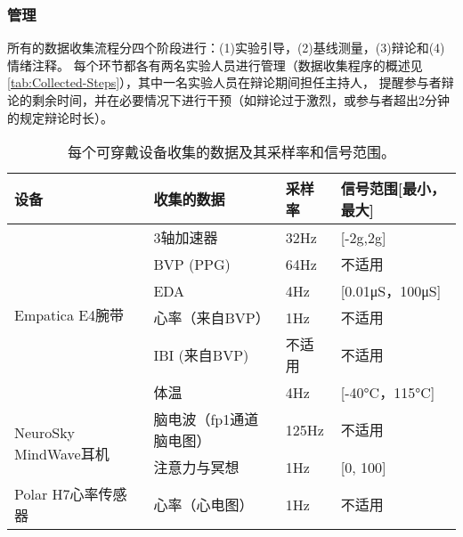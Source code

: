 \subsubsection{管理}
所有的数据收集流程分四个阶段进行：(1)实验引导，(2)基线测量，(3)辩论和(4)情绪注释。
每个环节都各有两名实验人员进行管理（数据收集程序的概述见\autoref{tab:Collected-Steps}），其中一名实验人员在辩论期间担任主持人，
提醒参与者辩论的剩余时间，并在必要情况下进行干预（如辩论过于激烈，或参与者超出2分钟的规定辩论时长）。
\begin{table}[htbp]
    \centering
    \footnotesize
    \setlength{\abovecaptionskip}{-0.1cm}
    \setlength{\belowcaptionskip}{0.2cm}
    \renewcommand\arraystretch{1.5}
    \caption[每个可穿戴设备收集的数据及其采样率和信号范围。]{每个可穿戴设备收集的数据及其采样率和信号范围。}
    \label{tab:Collected-Data}
    \begin{tabular}{|l|l|p{2cm}|l|}
    \hline
    设备                                   & 收集的数据         & 采样率   & 信号范围[最小，最大]    \\ \hline
    \multirow{6}{*}{Empatica E4腕带}       & 3轴加速器         & 32Hz  & [-2g,2g]       \\ \cline{2-4} 
                                         & BVP (PPG)     & 64Hz  & 不适用            \\ \cline{2-4} 
                                         & EDA           & 4Hz   & [0.01μS，100μS] \\ \cline{2-4} 
                                         & 心率（来自BVP）     & 1Hz   & 不适用            \\ \cline{2-4} 
                                         & IBI (来自BVP)   & 不适用   & 不适用            \\ \cline{2-4} 
                                         & 体温            & 4Hz   & [-40°C，115°C]  \\ \hline
    \multirow{2}{*}{NeuroSky MindWave耳机} & 脑电波（fp1通道脑电图） & 125Hz & 不适用            \\ \cline{2-4} 
                                         & 注意力与冥想        & 1Hz   & [0, 100]       \\ \hline
    Polar H7心率传感器                        & 心率（心电图）       & 1Hz   & 不适用            \\ \hline
    \end{tabular}
    \end{table}
